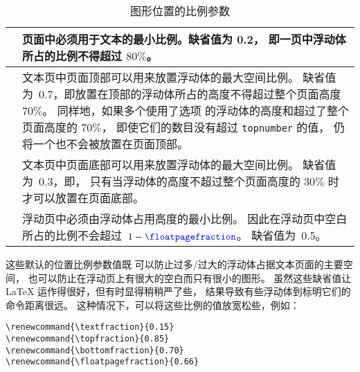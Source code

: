 \begin{table}[hbp]
	\centering
	\caption{图形位置的比例参数}\label{tab:floatfraction}
	\begin{tabular}{ l p{}}
		\toprule
		\cmd{textfraction} & 页面中必须用于文本的最小比例。缺省值为 0.2，
		即一页中浮动体所占的比例不得超过 $80\percent$。 \\
		\hline
		\cmd{topfraction} &  文本页中页面顶部可以用来放置浮动体的最大空间比例。
		缺省值为~0.7，即放置在顶部的浮动体所占的高度不得超过整个页面高度 $70\percent$。
		同样地，如果多个使用了选项 \opt{t} 的浮动体的高度和超过了整个页面高度的 $70\percent$，
		即使它们的数目没有超过 \texttt{topnumber} 的值，
		仍将一个也不会被放置在页面顶部。 \\
		\hline
		\cmd{bottomfraction} & 文本页中页面底部可以用来放置浮动体的最大空间比例。
		缺省值为~0.3，即，
		只有当浮动体的高度不超过整个页面高度的 $30\percent$ 时才可以放置在页面底部。\\
		\cline{2-2}
		\cmd{floatpagefraction} & 浮动页中必须由浮动体占用高度的最小比例。
		因此在浮动页中空白所占的比例不会超过~$1-\text{\cmd{floatpagefraction}}$。
		缺省值为~0.5。\\
		\bottomrule
	\end{tabular}
\end{table}

这些默认的位置比例参数值既
可以防止过多/过大的浮动体占据文本页面的主要空间，
也可以防止在浮动页上有很大的空白而只有很小的图形。
虽然这些缺省值让 \LaTeX{} 运作得很好，但有时显得稍稍严了些，
结果导致有些浮动体到标明它们的命令距离很远。
这种情况下，可以将这些比例的值放宽松些，例如：
\begin{lstlisting}
\renewcommand{\textfraction}{0.15} 
\renewcommand{\topfraction}{0.85} 
\renewcommand{\bottomfraction}{0.70} 
\renewcommand{\floatpagefraction}{0.66}
\end{lstlisting}

